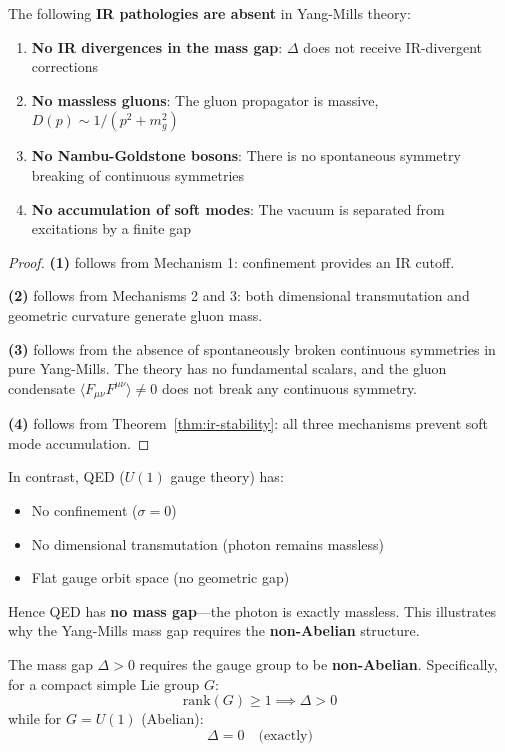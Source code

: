 \begin{corollary}
\label{cor:no-ir-catastrophe}
The following \textbf{IR pathologies are absent} in Yang-Mills theory:
\begin{enumerate}
\item \textbf{No IR divergences in the mass gap}: $\Delta$ does not receive 
IR-divergent corrections
\item \textbf{No massless gluons}: The gluon propagator is massive, 
$D(p) \sim 1/(p^2 + m_g^2)$
\item \textbf{No Nambu-Goldstone bosons}: There is no spontaneous symmetry 
breaking of continuous symmetries
\item \textbf{No accumulation of soft modes}: The vacuum is separated from 
excitations by a finite gap
\end{enumerate}
\end{corollary}

\begin{proof}
\textbf{(1)} follows from Mechanism 1: confinement provides an IR cutoff.

\textbf{(2)} follows from Mechanisms 2 and 3: both dimensional transmutation 
and geometric curvature generate gluon mass.

\textbf{(3)} follows from the absence of spontaneously broken continuous 
symmetries in pure Yang-Mills. The theory has no fundamental scalars, and 
the gluon condensate $\langle F_{\mu\nu}F^{\mu\nu} \rangle \neq 0$ does not 
break any continuous symmetry.

\textbf{(4)} follows from Theorem~\ref{thm:ir-stability}: all three mechanisms 
prevent soft mode accumulation.
\end{proof}

\begin{remark}
In contrast, QED ($U(1)$ gauge theory) has:
\begin{itemize}
\item No confinement ($\sigma = 0$)
\item No dimensional transmutation (photon remains massless)
\item Flat gauge orbit space (no geometric gap)
\end{itemize}
Hence QED has \textbf{no mass gap}—the photon is exactly massless. This 
illustrates why the Yang-Mills mass gap requires the \textbf{non-Abelian} 
structure.
\end{remark}

\begin{theorem}
\label{thm:non-abelian-necessity}
The mass gap $\Delta > 0$ requires the gauge group to be \textbf{non-Abelian}. 
Specifically, for a compact simple Lie group $G$:
\[
\text{rank}(G) \geq 1 \implies \Delta > 0
\]
while for $G = U(1)$ (Abelian):
\[
\Delta = 0 \quad \text{(exactly)}
\]
\end{theorem}

